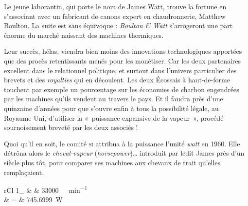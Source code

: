 	Le jeune laborantin, qui porte le nom de James Watt, trouve la fortune en s’associant avec un fabricant de canons expert en chaudronnerie, Matthew \mbox{Boulton}. La suite est sans équivoque : \textit{Boulton \& Watt} s’arrogeront une part énorme du marché naissant des machines thermiques.

	Leur succès, hélas, viendra bien moins des innovations technologiques apportées que des procès retentissants menés pour les monétiser. Car les deux partenaires excellent dans le relationnel politique, et surtout dans l’univers particulier des brevets et des \textit{royalties} qui en découlent. Les deux Écossais à haut-de-forme touchent par exemple un pourcentage sur les économies de charbon engendrées par les machines qu’ils vendent au travers le pays. Et il faudra près d’une quinzaine d’années pour que s’ouvre enfin à tous la possibilité légale, au Royaume-Uni, d’utiliser la «~puissance expansive de la vapeur~», procédé sournoisement breveté par les deux associés !

	Quoi qu’il en soit, le comité \textsc{si} attribua à la puissance l’unité \emph{watt} en 1960. Elle détrôna alors le \emph{cheval-vapeur} (\textit{horsepower})… introduit par ledit James près d’un siècle plus tôt, pour comparer ses machines aux chevaux de trait qu’elles remplaçaient.
	\begin{IEEEeqnarray*}{rCl}
		\SI{1}{\cheval}_ 	& \equiv & \SI{33 000}{\foot\lbf\per\minute}\\
													& = & \SI{745.6999}{\watt}
	\end{IEEEeqnarray*}
	
\atendofhistorysection

